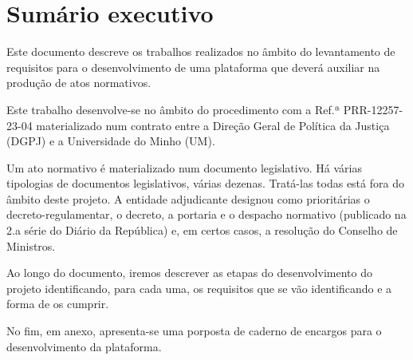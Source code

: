 \chapter{Sumário executivo}

Este documento descreve os trabalhos realizados no âmbito do levantamento de requisitos para o desenvolvimento 
de uma plataforma que deverá auxiliar na produção de atos normativos.

Este trabalho desenvolve-se no âmbito do procedimento com a Ref.ª PRR-12257-23-04 materializado num contrato 
entre a Direção Geral de Política da Justiça (DGPJ) e a Universidade do Minho (UM).

Um ato normativo é materializado num documento legislativo.
Há várias tipologias de documentos legislativos, várias dezenas.
Tratá-las todas está fora do âmbito deste projeto.
A entidade adjudicante designou como prioritárias o decreto-regulamentar, o decreto, a portaria e o despacho normativo 
(publicado na 2.a série do Diário da República) e, em certos casos, a resolução do Conselho de Ministros.

Ao longo do documento, iremos descrever as etapas do desenvolvimento do 
projeto identificando, para cada uma,
os requisitos que se vão identificando e a forma de os cumprir.

No fim, em anexo, apresenta-se uma porposta de caderno de encargos para o 
desenvolvimento da plataforma.